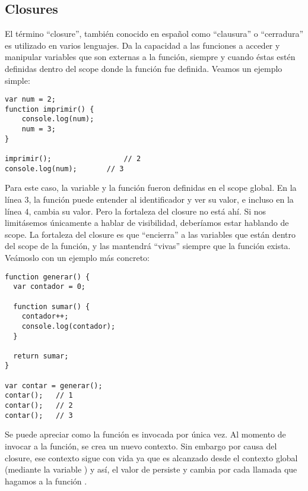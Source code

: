 
\subsection{Closures}
\label{sec:closures}

El término "`closure"', también conocido en español como "`clausura"' o "`cerradura"' es utilizado en varios lenguajes. Da la capacidad a las funciones a acceder y manipular variables que son externas a la función, siempre y cuando éstas estén definidas dentro del scope donde la función fue definida. Veamos un ejemplo simple:

\begin{lstlisting}[title={Creando un closure simple}]
var num = 2;
function imprimir() {
	console.log(num);
	num = 3;
}

imprimir();					// 2
console.log(num);		// 3
\end{lstlisting}

Para este caso, la variable  y la función  fueron definidas en el scope global. En la línea 3, la función puede entender al identificador  y ver su valor, e incluso en la línea 4, cambia su valor. Pero la fortaleza del closure no está ahí. Si nos limitásemos únicamente a hablar de visibilidad, deberíamos estar hablando de scope. La fortaleza del closure es que "`encierra"' a las variables que están dentro del scope de la función, y las mantendrá "`vivas"' siempre que la función exista. Veámoslo con un ejemplo más concreto:

\begin{lstlisting}[title={Analizando otro closure}]
function generar() {
  var contador = 0;

  function sumar() {
    contador++;
    console.log(contador);
  }

  return sumar;
}

var contar = generar();
contar();	// 1
contar();	// 2
contar();	// 3
\end{lstlisting}

Se puede apreciar como la función  es invocada por única vez. Al momento de invocar a la función, se crea un nuevo contexto. Sin embargo por causa del closure, ese contexto sigue con vida ya que es alcanzado desde el contexto global (mediante la variable ) y así, el valor de  persiste y cambia por cada llamada que hagamos a la función .
